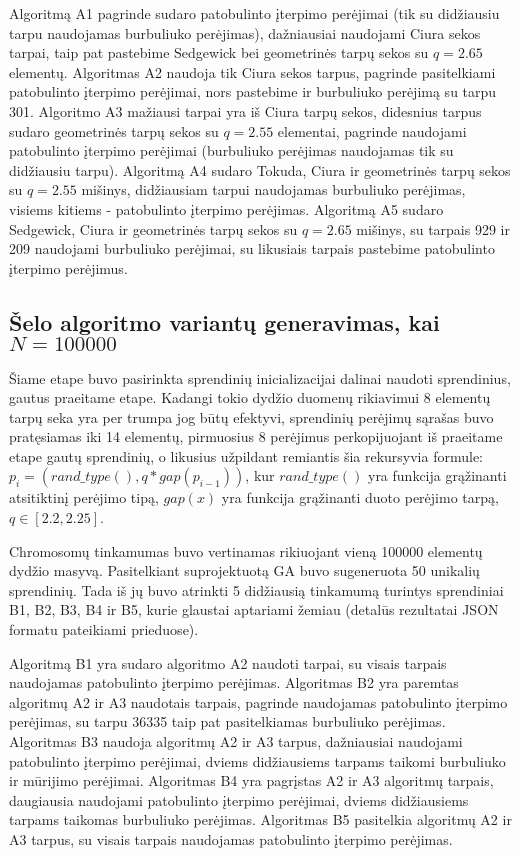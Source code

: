 \documentclass{VUMIFInfKursinis}
\begin{document}
Algoritmą A1 pagrinde sudaro patobulinto įterpimo perėjimai (tik su didžiausiu tarpu naudojamas burbuliuko perėjimas),
dažniausiai naudojami Ciura sekos tarpai, taip pat pastebime Sedgewick bei geometrinės tarpų sekos su $q = 2.65$ elementų.
Algoritmas A2 naudoja tik Ciura sekos tarpus, pagrinde pasitelkiami patobulinto įterpimo perėjimai, nors pastebime ir burbuliuko perėjimą su tarpu 301.
Algoritmo A3 mažiausi tarpai yra iš Ciura tarpų sekos, didesnius tarpus sudaro geometrinės tarpų sekos su $q = 2.55$ elementai,
pagrinde naudojami patobulinto įterpimo perėjimai (burbuliuko perėjimas naudojamas tik su didžiausiu tarpu).
Algoritmą A4 sudaro Tokuda, Ciura ir geometrinės tarpų sekos su $q = 2.55$ mišinys, didžiausiam tarpui naudojamas burbuliuko perėjimas, visiems kitiems - patobulinto įterpimo perėjimas.
Algoritmą A5 sudaro Sedgewick, Ciura ir geometrinės tarpų sekos su $q = 2.65$ mišinys, su tarpais 929 ir 209 naudojami burbuliuko perėjimai, su likusiais tarpais pastebime patobulinto įterpimo perėjimus.

\subsection{Šelo algoritmo variantų generavimas, kai $N = 100000$}

Šiame etape buvo pasirinkta sprendinių inicializacijai dalinai naudoti sprendinius, gautus praeitame etape.
Kadangi tokio dydžio duomenų rikiavimui 8 elementų tarpų seka yra per trumpa jog būtų efektyvi,
sprendinių perėjimų sąrašas buvo pratęsiamas iki 14 elementų, pirmuosius 8 perėjimus perkopijuojant iš praeitame etape gautų sprendinių,
o likusius užpildant remiantis šia rekursyvia formule: $p_i = (rand\_type(), q * gap(p_{i-1}))$,
kur $rand\_type()$ yra funkcija grąžinanti atsitiktinį perėjimo tipą, $gap(x)$ yra funkcija grąžinanti duoto perėjimo tarpą, $q \in \left[2.2, 2.25\right]$.

Chromosomų tinkamumas buvo vertinamas rikiuojant vieną 100000 elementų dydžio masyvą.
Pasitelkiant suprojektuotą GA buvo sugeneruota 50 unikalių sprendinių.
Tada iš jų buvo atrinkti 5 didžiausią tinkamumą turintys sprendiniai B1, B2, B3, B4 ir B5, kurie glaustai aptariami žemiau (detalūs rezultatai JSON formatu pateikiami prieduose).

Algoritmą B1 yra sudaro algoritmo A2 naudoti tarpai, su visais tarpais naudojamas patobulinto įterpimo perėjimas.
Algoritmas B2 yra paremtas algoritmų A2 ir A3 naudotais tarpais, pagrinde naudojamas patobulinto įterpimo perėjimas, su tarpu 36335 taip pat pasitelkiamas burbuliuko perėjimas.
Algoritmas B3 naudoja algoritmų A2 ir A3 tarpus, dažniausiai naudojami patobulinto įterpimo perėjimai, dviems didžiausiems tarpams taikomi burbuliuko ir mūrijimo perėjimai.
Algoritmas B4 yra pagrįstas A2 ir A3 algoritmų tarpais, daugiausia naudojami patobulinto įterpimo perėjimai, dviems didžiausiems tarpams taikomas burbuliuko perėjimas.
Algoritmas B5 pasitelkia algoritmų A2 ir A3 tarpus, su visais tarpais naudojamas patobulinto įterpimo perėjimas.
\end{document}
